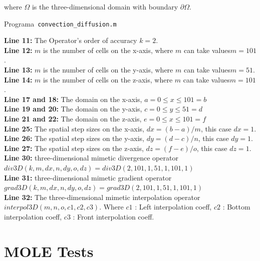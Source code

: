 where  $\Omega$  is the three-dimensional domain with  boundary $\partial  \Omega $.

\begin{listing}[ht!]
    \tiny
    \centering
    \caption{Programa~\texttt{convection\_diffusion.m}}
    \label{code:convection_diffusion.m}
\end{listing}

\textbf{Line 11:} The Operator's order of accuracy $k = 2$.\\

\textbf{Line 12:} $m$ is the number of cells on the x-axis, where $m$ can take values ​​$m= 101$.\\

\textbf{Line 13:} $m$ is the number of cells on the y-axis, where $m$ can take values ​​$m= 51$.\\

\textbf{Line 14:} $m$ is the number of cells on the z-axis, where $m$ can take values ​​$m= 101$.\\

\textbf{Line 17 and 18:} The domain on the  x-axis, $a=0 \leq x \leq 101=b$\\

\textbf{Line 19 and 20:} The domain on the  y-axis, $c=0 \leq y \leq 51=d$\\

\textbf{Line 21 and 22:} The domain on the  z-axis, $e=0 \leq x \leq 101=f$\\

\textbf{Line 25:} The spatial step sizes on the x-axis, $ dx = (b-a)/m$, this case $dx = 1$.\\

\textbf{Line 26:} The spatial step sizes on the y-axis, $ dy = (d-c)/n$, this case $dy = 1$.\\

\textbf{Line 27:} The spatial step sizes on the z-axis, $ dz = (f-e)/o$, this case $dz = 1$.\\

\textbf{Line 30:} three-dimensional mimetic divergence operator $div3D(k,m,dx,n,dy,o,dz)=div3D(2,101,1,51,1,101,1)$\\

\textbf{Line 31:} three-dimensional mimetic gradient operator $grad3D(k,m,dx,n,dy,o,dz)=grad3D(2,101,1,51,1,101,1)$\\

\textbf{Line 32:} The three-dimensional mimetic interpolation operator 
 $interpol3D(m, n, o, c1, c2, c3)$.  Where $c1$ : Left interpolation coeff, $c2$ : Bottom interpolation coeff, $c3$ : Front interpolation coeff.\\













\chapter{MOLE Tests}

